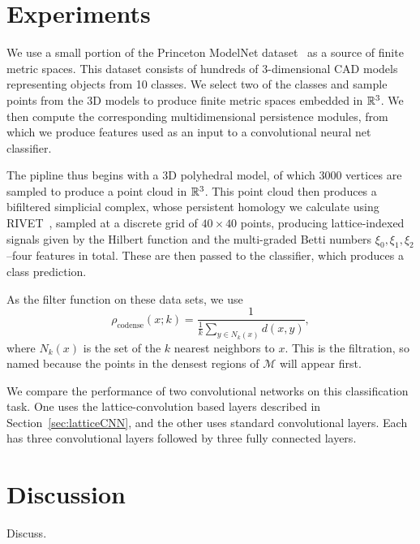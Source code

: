 \documentclass{article}
\begin{document}
\section{Experiments}
We use a small portion of the Princeton ModelNet
dataset~\cite{zhirong_wu_3d_2015} as a source of finite
metric spaces. This dataset consists of hundreds of 3-dimensional CAD models
representing objects from 10 classes. We select two of the classes and sample
points from the 3D models to produce finite metric spaces embedded in $\mathbb{R}^3$.
We then compute the corresponding multidimensional persistence modules, from
which we produce features used as an input to a convolutional neural net
classifier.

The pipline thus begins with a 3D polyhedral model, of which $3000$ vertices are sampled to produce a point
cloud in $\mathbb{R}^3$. This point cloud then produces a bifiltered simplicial complex,
whose persistent homology we calculate using
RIVET~\cite{lesnick_interactive_2015}, sampled at a discrete grid of $40 \times
40$ points, producing lattice-indexed signals given by the Hilbert function and
the multi-graded Betti numbers $\xi_0, \xi_1, \xi_2$--four features in total. These are then passed to the classifier, which
produces a class prediction.

As the filter function on these data sets, we use
\[\rho_{\text{codense}}(x;k) = \frac{1}{\frac{1}{k} \sum_{y \in N_k(x)}
    d(x,y)},\]
where $N_k(x)$ is the set of the $k$ nearest neighbors to $x$. This is the
 filtration, so named because the points in the densest
regions of $\mathcal M$ will appear first.


We compare the performance of two convolutional networks on this classification
task. One uses the lattice-convolution based layers described in
Section~\ref{sec:latticeCNN}, and the other uses standard convolutional layers.
Each has three convolutional layers followed by three fully connected layers.




\section{Discussion}
Discuss.




\end{document}
